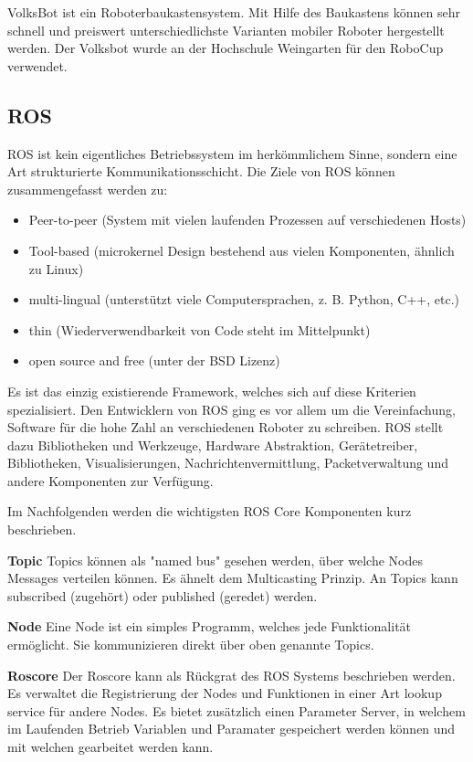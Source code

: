 \documentclass[12pt]{article}
\begin{document}
VolksBot ist ein Roboterbaukastensystem.
Mit Hilfe des Baukastens können sehr schnell und preiswert unterschiedlichste Varianten mobiler Roboter hergestellt werden.
Der Volksbot wurde an der Hochschule Weingarten für den RoboCup verwendet.
\subsection{ROS}
ROS ist kein eigentliches Betriebssystem im herkömmlichem Sinne, sondern eine Art strukturierte Kommunikationsschicht.
Die Ziele von ROS können zusammengefasst werden zu:
\begin{itemize}
\item Peer-to-peer (System mit vielen laufenden Prozessen auf verschiedenen Hosts)
\item Tool-based (microkernel Design bestehend aus vielen Komponenten, ähnlich zu Linux)
\item multi-lingual (unterstützt viele Computersprachen, z. B. Python, C++, etc.)
\item thin (Wiederverwendbarkeit von Code steht im Mittelpunkt)
\item open source and free (unter der BSD Lizenz)
\end{itemize}
Es ist das einzig existierende Framework, welches sich auf diese Kriterien spezialisiert.
Den Entwicklern von ROS ging es vor allem um die Vereinfachung, Software für die hohe Zahl an verschiedenen Roboter zu schreiben.
ROS stellt dazu Bibliotheken und Werkzeuge, Hardware Abstraktion, Gerätetreiber, Bibliotheken, Visualisierungen, Nachrichtenvermittlung, Packetverwaltung und andere Komponenten zur Verfügung.

Im Nachfolgenden werden die wichtigsten ROS Core Komponenten kurz beschrieben.

{\bf Topic} Topics können als "named bus" gesehen werden, über welche Nodes Messages verteilen können. Es ähnelt dem Multicasting Prinzip. An Topics kann subscribed (zugehört) oder published (geredet) werden.

{\bf Node} Eine Node ist ein simples Programm, welches jede Funktionalität ermöglicht.  Sie kommunizieren direkt über oben genannte Topics.

{\bf Roscore} Der Roscore kann als Rückgrat des ROS Systems beschrieben werden. Es verwaltet die Registrierung der Nodes und Funktionen in einer Art lookup service für andere Nodes. Es bietet zusätzlich einen Parameter Server, in welchem im Laufenden Betrieb Variablen und Paramater gespeichert werden können und mit welchen gearbeitet werden kann.
\end{document}
